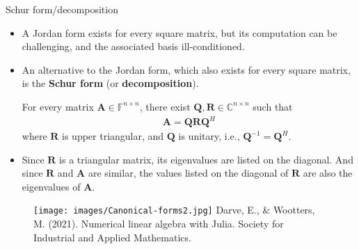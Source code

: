 \documentclass[t,usepdftitle=false]{beamer}
\begin{document}
\begin{frame}{Schur form/decomposition}
\begin{itemize}
\item A Jordan form exists for every square matrix, but its computation can be challenging, and the associated basis ill-conditioned.
\item An alternative to the Jordan form, which also exists for every square matrix, is the \textbf{Schur form} (or \textbf{decomposition}).
\begin{theorem}
For every matrix $\mathbf{A}\in\mathbb{F}^{n\times n}$, there exist $\mathbf{Q},\mathbf{R}\in\mathbb{C}^{n\times n}$ such that
\begin{align*}
\mathbf{A}=\mathbf{Q}\mathbf{R}\mathbf{Q}^H
\end{align*}
where $\mathbf{R}$ is upper triangular, and $\mathbf{Q}$ is unitary, i.e., $\mathbf{Q}^{-1}=\mathbf{Q}^H$.
\end{theorem}
\item Since $\mathbf{R}$ is a triangular matrix, its eigenvalues are listed on the diagonal.
And since $\mathbf{R}$ and $\mathbf{A}$ are similar, the values listed on the diagonal of $\mathbf{R}$ are also the eigenvalues of $\mathbf{A}$.
\end{itemize}
\end{frame}

\begin{frame}{}
\vspace{.7cm}
\begin{figure}
\texttt{[image: images/Canonical-forms2.jpg]}
\vfill
\tiny{Darve, E., \& Wootters, M. (2021). Numerical linear algebra with Julia. Society for Industrial and Applied Mathematics.}
\end{figure}
\end{frame}
\end{document}
